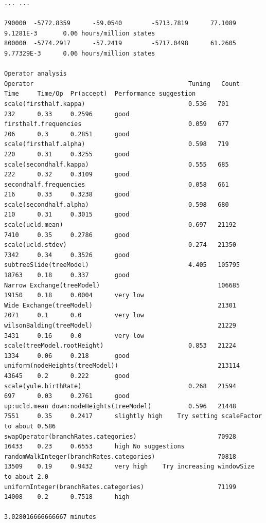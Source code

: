 \documentclass[12pt]{article}
\begin{document}
{\begin{verbatim}
... ...

790000	-5772.8359  	-59.0540    	-5713.7819  	77.1089     	9.1281E-3   	0.06 hours/million states
800000	-5774.2917  	-57.2419    	-5717.0498  	61.2605     	9.77329E-3  	0.06 hours/million states

Operator analysis
Operator                                          Tuning   Count      Time     Time/Op  Pr(accept)  Performance suggestion
scale(firsthalf.kappa)                            0.536   701        232      0.33     0.2596      good	
firsthalf.frequencies                             0.059   677        206      0.3      0.2851      good	
scale(firsthalf.alpha)                            0.598   719        220      0.31     0.3255      good	
scale(secondhalf.kappa)                           0.555   685        222      0.32     0.3109      good	
secondhalf.frequencies                            0.058   661        216      0.33     0.3238      good	
scale(secondhalf.alpha)                           0.598   680        210      0.31     0.3015      good	
scale(ucld.mean)                                  0.697   21192      7410     0.35     0.2786      good	
scale(ucld.stdev)                                 0.274   21350      7342     0.34     0.3526      good	
subtreeSlide(treeModel)                           4.405   105795     18763    0.18     0.337       good	
Narrow Exchange(treeModel)                                106685     19150    0.18     0.0004      very low	
Wide Exchange(treeModel)                                  21301      2071     0.1      0.0         very low	
wilsonBalding(treeModel)                                  21229      3431     0.16     0.0         very low	
scale(treeModel.rootHeight)                       0.853   21224      1334     0.06     0.218       good	
uniform(nodeHeights(treeModel))                           213114     43645    0.2      0.222       good	
scale(yule.birthRate)                             0.268   21594      697      0.03     0.2761      good	
up:ucld.mean down:nodeHeights(treeModel)          0.596   21448      7551     0.35     0.2417      slightly high	Try setting scaleFactor to about 0.586
swapOperator(branchRates.categories)                      70928      16433    0.23     0.6553      high	No suggestions
randomWalkInteger(branchRates.categories)                 70818      13509    0.19     0.9432      very high	Try increasing windowSize to about 2.0
uniformInteger(branchRates.categories)                    71199      14008    0.2      0.7518      high	

3.028016666666667 minutes 
\end{verbatim}}
\end{document}

